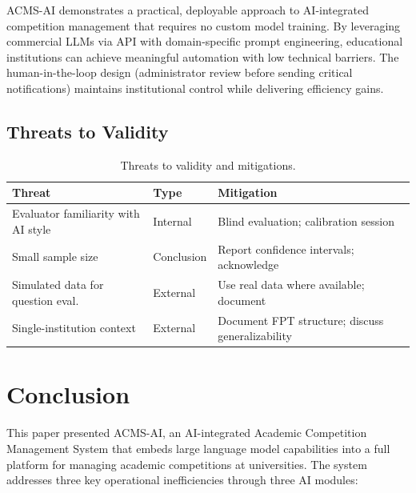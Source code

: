 \documentclass[runningheads]{llncs}
\begin{document}
ACMS-AI demonstrates a practical, deployable approach to AI-integrated competition management that requires no custom model training. By leveraging commercial LLMs via API with domain-specific prompt engineering, educational institutions can achieve meaningful automation with low technical barriers. The human-in-the-loop design (administrator review before sending critical notifications) maintains institutional control while delivering efficiency gains.

\subsection{Threats to Validity}

\begin{table}[t]
\caption{Threats to validity and mitigations.}\label{tab:threats}
\begin{tabular}{lll}
\toprule
\textbf{Threat} & \textbf{Type} & \textbf{Mitigation} \\
\midrule
Evaluator familiarity with AI style & Internal  & Blind evaluation; calibration session \\
Small sample size                   & Conclusion & Report confidence intervals; acknowledge \\
Simulated data for question eval.   & External   & Use real data where available; document \\
Single-institution context          & External   & Document FPT structure; discuss generalizability \\
\bottomrule
\end{tabular}
\end{table}

\section{Conclusion}

This paper presented ACMS-AI, an AI-integrated Academic Competition Management System that embeds large language model capabilities into a full platform for managing academic competitions at universities. The system addresses three key operational inefficiencies through three AI modules:
\end{document}
